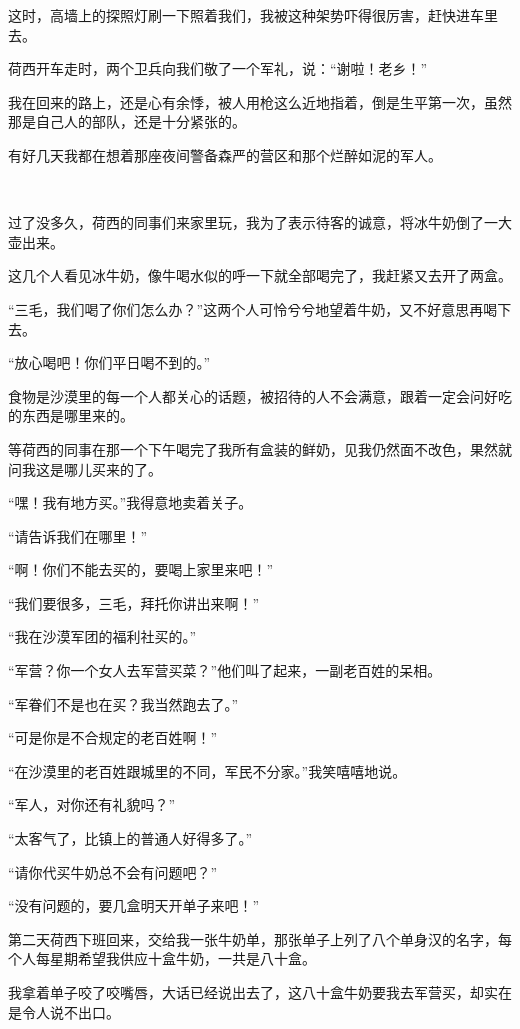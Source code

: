 \par 这时，高墙上的探照灯刷一下照着我们，我被这种架势吓得很厉害，赶快进车里去。
\par 荷西开车走时，两个卫兵向我们敬了一个军礼，说：“谢啦！老乡！”
\par 我在回来的路上，还是心有余悸，被人用枪这么近地指着，倒是生平第一次，虽然那是自己人的部队，还是十分紧张的。
\par 有好几天我都在想着那座夜间警备森严的营区和那个烂醉如泥的军人。
\par  
\par 过了没多久，荷西的同事们来家里玩，我为了表示待客的诚意，将冰牛奶倒了一大壶出来。
\par 这几个人看见冰牛奶，像牛喝水似的呼一下就全部喝完了，我赶紧又去开了两盒。
\par “三毛，我们喝了你们怎么办？”这两个人可怜兮兮地望着牛奶，又不好意思再喝下去。
\par “放心喝吧！你们平日喝不到的。”
\par 食物是沙漠里的每一个人都关心的话题，被招待的人不会满意，跟着一定会问好吃的东西是哪里来的。
\par 等荷西的同事在那一个下午喝完了我所有盒装的鲜奶，见我仍然面不改色，果然就问我这是哪儿买来的了。
\par “嘿！我有地方买。”我得意地卖着关子。
\par “请告诉我们在哪里！”
\par “啊！你们不能去买的，要喝上家里来吧！”
\par “我们要很多，三毛，拜托你讲出来啊！”
\par “我在沙漠军团的福利社买的。”
\par “军营？你一个女人去军营买菜？”他们叫了起来，一副老百姓的呆相。
\par “军眷们不是也在买？我当然跑去了。”
\par “可是你是不合规定的老百姓啊！”
\par “在沙漠里的老百姓跟城里的不同，军民不分家。”我笑嘻嘻地说。
\par “军人，对你还有礼貌吗？”
\par “太客气了，比镇上的普通人好得多了。”
\par “请你代买牛奶总不会有问题吧？”
\par “没有问题的，要几盒明天开单子来吧！”
\par 第二天荷西下班回来，交给我一张牛奶单，那张单子上列了八个单身汉的名字，每个人每星期希望我供应十盒牛奶，一共是八十盒。
\par 我拿着单子咬了咬嘴唇，大话已经说出去了，这八十盒牛奶要我去军营买，却实在是令人说不出口。
